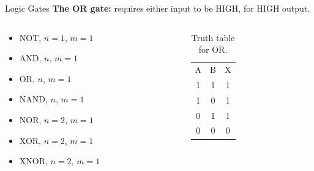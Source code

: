 \documentclass{beamer}
\begin{document}
\begin{frame}{Logic Gates}
\textbf{The OR gate:} requires either input to be HIGH, for HIGH output. \\ \vspace{0.5cm}
\begin{columns}[T]
\begin{column}{0.5\textwidth}
\begin{itemize}
\item \alert{NOT, $n=1$, $m=1$}
\item \alert{AND, $n$, $m=1$}
\item \alert{OR, $n$, $m=1$}
\item NAND, $n$, $m=1$
\item NOR, $n=2$, $m=1$
\item XOR, $n=2$, $m=1$
\item XNOR, $n=2$, $m=1$
\end{itemize}
\end{column}
\begin{column}{0.5\textwidth}
\begin{table}
\begin{tabular}{c c c}
A & B & X \\
1 & 1 & 1 \\
1 & 0 & 1 \\
0 & 1 & 1 \\
0 & 0 & 0
\end{tabular}
\caption{\label{tab:OR} Truth table for OR.}
\end{table}
\end{column}
\end{columns}
\end{frame}
\end{document}
